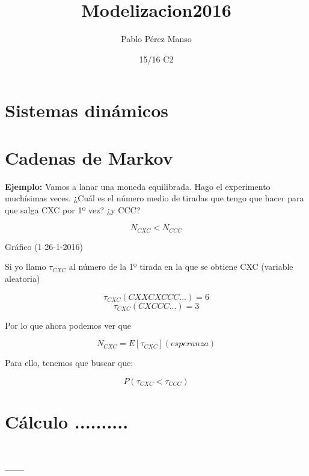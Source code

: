 \documentclass[palatino]{apuntes}
\title{Modelizacion2016}
\author{Pablo Pérez Manso}
\date{15/16 C2}
\begin{document}
\pagestyle{plain}
\maketitle

\tableofcontents
\newpage

\chapter{Sistemas dinámicos}

\chapter{Cadenas de Markov}

	\textbf{Ejemplo:} Vamos a lanar una moneda equilibrada. Hago el experimento muchísimas veces. ¿Cuál es el número medio de tiradas que tengo que hacer para que salga CXC por 1º vez? ¿y CCC?

$$N_{CXC} < N_{CCC}$$

Gráfico (1 26-1-2016)

Si yo llamo $\tau_{CXC}$ al número de la 1º tirada en la que se obtiene CXC (variable aleatoria)

$$\tau_{CXC}(CXXCXCCC...)=6$$
$$\tau_{CXC}(CXCCC...)=3$$

Por lo que ahora podemos ver que 

$$N_{CXC} = E[\tau_{CXC}] (esperanza)$$

Para ello, tenemos que buscar que:

$$P(\tau_{CXC} < \tau_{CCC})$$

\chapter{Cálculo ..........}

\appendix

\chapter{---}

\printindex
\end{document}

